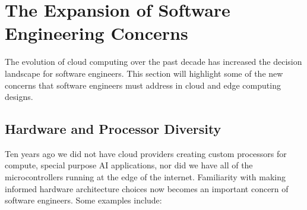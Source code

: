 \documentclass[conference]{IEEEconf}
\begin{document}
\section{The Expansion of Software Engineering Concerns}
\label{sec:Polyglot}
The evolution of cloud computing over the past decade has increased the decision landscape for software engineers. This section will highlight some of the new concerns that software engineers must address in cloud and edge computing designs.

\subsection{Hardware and Processor Diversity}
Ten years ago we did not have cloud providers creating custom processors for compute, special purpose AI applications, nor did we have all of the microcontrollers running at the edge of the internet. Familiarity with making informed hardware architecture choices now becomes an important concern of software engineers. Some examples include:
\end{document}
